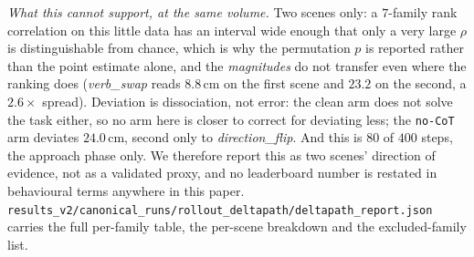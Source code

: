 \emph{What this cannot support, at the same volume.} Two scenes only: a $7$-family rank correlation on this little data has an interval wide enough that only a very large $\rho$ is distinguishable from chance, which is why the permutation $p$ is reported rather than the point estimate alone, and the \emph{magnitudes} do not transfer even where the ranking does (\emph{verb\_swap} reads $8.8$\,cm on the first scene and $23.2$ on the second, a $2.6\times$ spread). Deviation is dissociation, not error: the clean arm does not solve the task either, so no arm here is closer to correct for deviating less; the \texttt{no-CoT} arm deviates $24.0$\,cm, second only to \emph{direction\_flip}. And this is $80$ of $400$ steps, the approach phase only. We therefore report this as two scenes' direction of evidence, not as a validated proxy, and no leaderboard number is restated in behavioural terms anywhere in this paper. \texttt{results\_v2/\allowbreak{}canonical\_runs/\allowbreak{}rollout\_deltapath/\allowbreak{}deltapath\_report.json} carries the full per-family table, the per-scene breakdown and the excluded-family list.

